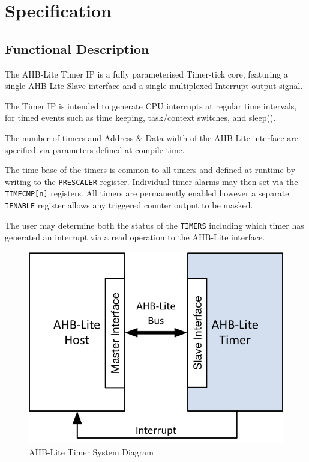 \chapter{Specification} \label{specifications}

\section{Functional Description}\label{functional-description}

The AHB-Lite Timer IP is a fully parameterised Timer-tick core,
featuring a single AHB-Lite Slave interface and a single multiplexed
Interrupt output signal.

The Timer IP is intended to generate CPU interrupts at regular time
intervals, for timed events such as time keeping, task/context switches,
and sleep().

The number of timers and Address \& Data width of the AHB-Lite interface
are specified via parameters defined at compile time.

The time base of the timers is common to all timers and defined at
runtime by writing to the \texttt{PRESCALER} register. Individual timer alarms
may then set via the \texttt{TIMECMP[n]} registers. All timers are
permanently enabled however a separate \texttt{IENABLE} register allows any
triggered counter output to be masked.

The user may determine both the status of the \texttt{TIMERS} including which
timer has generated an interrupt via a read operation to the AHB-Lite
interface.

\begin{figure}[tbh]
	\centering
	\includegraphics{assets/img/AHB-Lite-Timer-sys.png}
	\caption{AHB-Lite Timer System Diagram}
	\label{fig:ahb-lite-timer-sys}
\end{figure}
